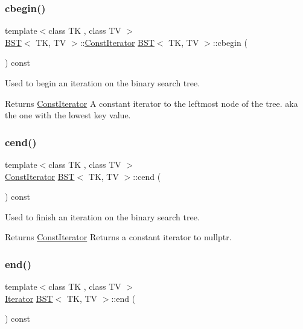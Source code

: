 \subsubsection{\texorpdfstring{cbegin()}{cbegin()}}
{\footnotesize\ttfamily template$<$class TK , class TV $>$ \\
\hyperlink{classBST}{B\+ST}$<$ TK, TV $>$\+::\hyperlink{classBST_1_1ConstIterator}{Const\+Iterator} \hyperlink{classBST}{B\+ST}$<$ TK, TV $>$\+::cbegin (\begin{DoxyParamCaption}{ }\end{DoxyParamCaption}) const}



Used to begin an iteration on the binary search tree. 

\begin{DoxyReturn}{Returns}
\hyperlink{classBST_1_1ConstIterator}{Const\+Iterator} A constant iterator to the leftmost node of the tree. aka the one with the lowest key value. 
\end{DoxyReturn}
\mbox{\label{classBST_a3df704e278d2c00fe8ec1b41701e4712}} 
\subsubsection{\texorpdfstring{cend()}{cend()}}
{\footnotesize\ttfamily template$<$class TK , class TV $>$ \\
\hyperlink{classBST_1_1ConstIterator}{Const\+Iterator} \hyperlink{classBST}{B\+ST}$<$ TK, TV $>$\+::cend (\begin{DoxyParamCaption}{ }\end{DoxyParamCaption}) const\hspace{0.3cm}{\ttfamily [inline]}}



Used to finish an iteration on the binary search tree. 

\begin{DoxyReturn}{Returns}
\hyperlink{classBST_1_1ConstIterator}{Const\+Iterator} Returns a constant iterator to nullptr. 
\end{DoxyReturn}
\mbox{\label{classBST_a57b56c3f93a9816de6df6435966eacc5}} 
\subsubsection{\texorpdfstring{end()}{end()}}
{\footnotesize\ttfamily template$<$class TK , class TV $>$ \\
\hyperlink{classBST_1_1Iterator}{Iterator} \hyperlink{classBST}{B\+ST}$<$ TK, TV $>$\+::end (\begin{DoxyParamCaption}{ }\end{DoxyParamCaption}) const\hspace{0.3cm}{\ttfamily [inline]}}



